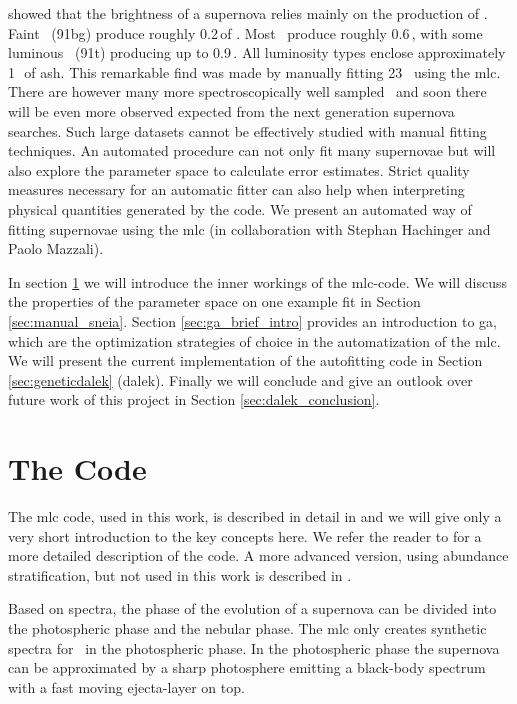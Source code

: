  \cite{2007Sci...315..825M} showed that the brightness of a supernova relies mainly on the production of \Ni. Faint \sneia\ (\gls{91bg}) produce roughly 0.2\,\msun of \Ni. Most \sneia\ produce roughly 0.6\,\msun, with some luminous \sneia\ (\gls{91t}) producing up to 0.9\,\msun. All luminosity types enclose approximately 1\,\msun\ of ash. This remarkable find was made by manually fitting 23 \sneia\ using the \gls{mlc}. There are however many more spectroscopically well sampled \sneia\ and soon there will be even more observed expected from the next generation supernova searches. Such large datasets cannot be effectively studied with manual fitting techniques. An automated procedure can not only fit many supernovae but will also explore the parameter space to calculate error estimates. Strict quality measures necessary for an automatic fitter can also help when interpreting physical quantities generated by the code. We present an automated way of fitting supernovae using the  \gls{mlc} (in collaboration with Stephan Hachinger and Paolo Mazzali).

In section \ref{sec:mlc_intro} we will introduce the inner workings of the \gls{mlc}-code.  We will discuss the properties of the parameter space on one example fit in Section \ref{sec:manual_sneia}. Section \ref{sec:ga_brief_intro} provides an introduction to \gls{ga}, which are the optimization strategies of choice in the automatization of the \gls{mlc}.  We will present the current implementation of the autofitting code in Section \ref{sec:geneticdalek} (\gls{dalek}).  Finally we will conclude and give an outlook over future work of this project in Section \ref{sec:dalek_conclusion}.

\section{The  Code}
\label{sec:mlc_intro}

The \gls{mlc} code, used in this work, is described in detail in \citet{2000A&A...363..705M} and we will give only a very short introduction to the key concepts here. We refer the reader to \citet{2000A&A...363..705M} for a more detailed description of the code. A more advanced version, using abundance stratification, but not used in this work  is described in \citet{2000A&A...363..705M}. 

Based on spectra, the phase of the evolution of a supernova can be divided into the photospheric phase and the nebular phase. The \gls{mlc} only creates synthetic spectra for \snia\ in the photospheric phase. In the photospheric phase the supernova can be approximated by a sharp photosphere emitting a black-body spectrum with a fast moving ejecta-layer on top.

